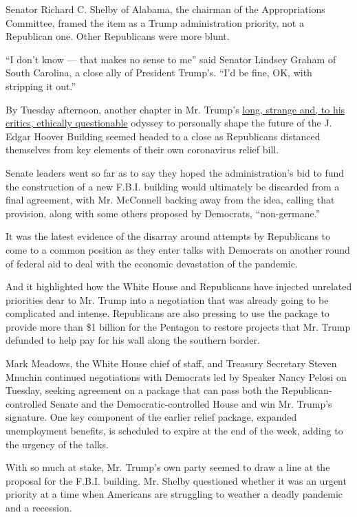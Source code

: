 Senator Richard C. Shelby of Alabama, the chairman of the Appropriations
Committee, framed the item as a Trump administration priority, not a
Republican one. Other Republicans were more blunt.

``I don't know --- that makes no sense to me'' said Senator Lindsey
Graham of South Carolina, a close ally of President Trump's. ``I'd be
fine, OK, with stripping it out.''

By Tuesday afternoon, another chapter in Mr. Trump's
\href{https://www.nytimes.com/2018/11/02/us/politics/fbi-building-costs.html}{long,
strange and, to his critics, ethically questionable} odyssey to
personally shape the future of the J. Edgar Hoover Building seemed
headed to a close as Republicans distanced themselves from key elements
of their own coronavirus relief bill.

Senate leaders went so far as to say they hoped the administration's bid
to fund the construction of a new F.B.I. building would ultimately be
discarded from a final agreement, with Mr. McConnell backing away from
the idea, calling that provision, along with some others proposed by
Democrats, ``non-germane.''

It was the latest evidence of the disarray around attempts by
Republicans to come to a common position as they enter talks with
Democrats on another round of federal aid to deal with the economic
devastation of the pandemic.

And it highlighted how the White House and Republicans have injected
unrelated priorities dear to Mr. Trump into a negotiation that was
already going to be complicated and intense. Republicans are also
pressing to use the package to provide more than \$1 billion for the
Pentagon to restore projects that Mr. Trump defunded to help pay for his
wall along the southern border.

Mark Meadows, the White House chief of staff, and Treasury Secretary
Steven Mnuchin continued negotiations with Democrats led by Speaker
Nancy Pelosi on Tuesday, seeking agreement on a package that can pass
both the Republican-controlled Senate and the Democratic-controlled
House and win Mr. Trump's signature. One key component of the earlier
relief package, expanded unemployment benefits, is scheduled to expire
at the end of the week, adding to the urgency of the talks.

With so much at stake, Mr. Trump's own party seemed to draw a line at
the proposal for the F.B.I. building. Mr. Shelby questioned whether it
was an urgent priority at a time when Americans are struggling to
weather a deadly pandemic and a recession.

